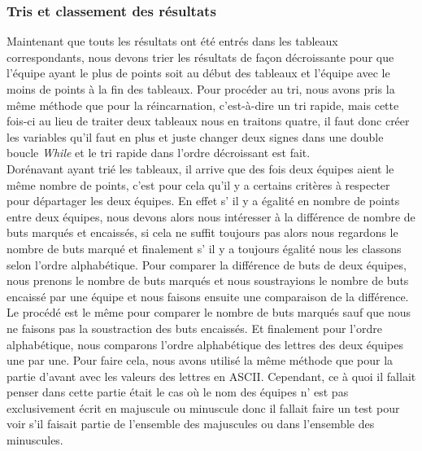 \documentclass[13pt]{article}
\begin{document}
\subsubsection*{Tris et classement des résultats}
Maintenant que touts les résultats ont été entrés dans les tableaux correspondants, nous devons trier les résultats de façon décroissante pour que l'équipe ayant le plus de points soit au début des tableaux et l'équipe avec le moins de points à la fin des tableaux. Pour procéder au tri, nous avons pris la même méthode que pour la réincarnation, c'est-à-dire un tri rapide, mais cette fois-ci au lieu de traiter deux tableaux nous en traitons quatre, il faut donc créer les variables qu'il faut en plus et juste changer deux signes dans une double boucle \emph{While} et le tri rapide dans l'ordre décroissant est fait.
\\
Dorénavant ayant trié les tableaux, il arrive que des fois deux équipes aient le même nombre de points, c'est pour cela qu'il y a certains critères à respecter pour départager les deux équipes. En effet s’ il y a égalité en nombre de points entre deux équipes, nous devons alors nous intéresser à la différence de nombre de buts marqués et encaissés, si cela ne suffit toujours pas alors nous regardons le nombre de buts marqué et finalement s’ il y a toujours égalité nous les classons selon l'ordre alphabétique. Pour comparer la différence de buts de deux équipes, nous prenons le nombre de buts marqués et nous soustrayions le nombre de buts encaissé par une équipe et nous faisons ensuite une comparaison de la différence. Le procédé est le même pour comparer le nombre de buts marqués sauf que nous ne faisons pas la soustraction des buts encaissés. Et finalement pour l'ordre alphabétique, nous comparons l'ordre alphabétique des lettres des deux équipes une par une. Pour faire cela, nous avons utilisé la même méthode que pour la partie d'avant avec les valeurs des lettres en ASCII. Cependant, ce à quoi il fallait penser dans cette partie était le cas où le nom des équipes n’ est pas exclusivement écrit en majuscule ou minuscule donc il fallait faire un test pour voir s'il faisait partie de l'ensemble des majuscules ou dans l'ensemble des minuscules.
\end{document}
